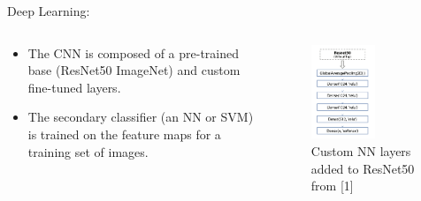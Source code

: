 \documentclass[14pt]{beamer}
\begin{document}
\begin{frame}{Deep Learning:}
\fontsize{14pt}{7.2}\selectfont
    \begin{columns}
        \begin{column}{0.5\textwidth}
            \begin{itemize}
                \item The CNN is composed of a pre-trained base (ResNet50 ImageNet) and custom fine-tuned layers.
                \item The secondary classifier (an NN or SVM) is trained on the feature maps for a training set of images.
            \end{itemize}
        \end{column}
        \begin{column}{0.5\textwidth}
            \centering
            \begin{figure}
                \centering
                \includegraphics[width=0.60\textwidth]{NNarchitecture.png}
                \caption{Custom NN layers added to ResNet50 from [1]}
            \end{figure}
        \end{column}
    \end{columns}
\end{frame}
\end{document}
